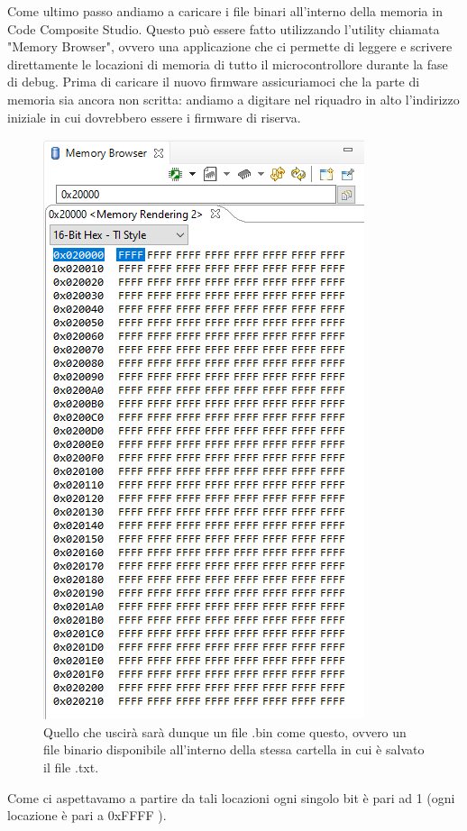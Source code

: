 \documentclass[LaM,binding=0.6cm,oneside]{../sapthesis}
\begin{document}
Come ultimo passo andiamo a caricare i file binari all'interno della memoria in Code Composite Studio.
Questo può essere fatto utilizzando l'utility chiamata "Memory Browser", ovvero una applicazione che ci permette di leggere e scrivere direttamente le locazioni di memoria di tutto il microcontrollore durante la fase di debug.
\newpage
Prima di caricare il nuovo firmware assicuriamoci che la parte di memoria sia ancora non scritta: andiamo a digitare nel riquadro in alto l'indirizzo iniziale in cui dovrebbero essere i firmware di riserva.
\begin{figure}[htbp]
\centerline{\includegraphics[scale=0.58]{examples/MemoryBrowserTi.PNG}}
\caption{Quello che uscirà sarà dunque un file .bin come questo, ovvero un file binario disponibile all'interno della stessa cartella in cui è salvato il file .txt.}
\label{fig}
\end{figure}
\newline


Come ci aspettavamo a partire da tali locazioni ogni singolo bit è pari ad 1 (ogni locazione è pari a 0xFFFF ). 
\end{document}
